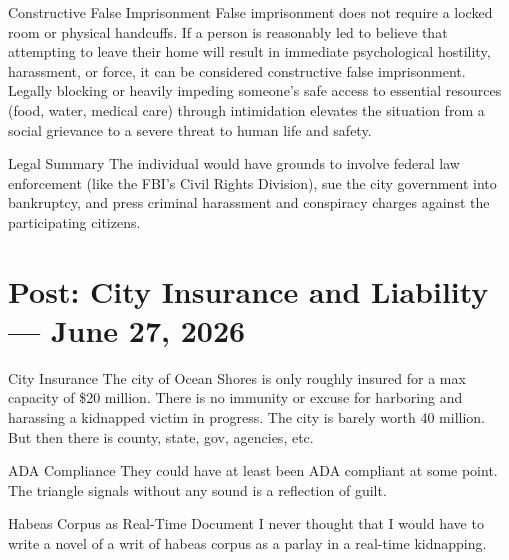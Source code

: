 \documentclass[12pt,openany]{book}
\begin{document}
\begin{evidencebox}{Constructive False Imprisonment}
False imprisonment does not require a locked room or physical handcuffs. If a person is reasonably led to believe that attempting to leave their home will result in immediate psychological hostility, harassment, or force, it can be considered constructive false imprisonment. Legally blocking or heavily impeding someone's safe access to essential resources (food, water, medical care) through intimidation elevates the situation from a social grievance to a severe threat to human life and safety.
\end{evidencebox}


\begin{evidencebox}{Legal Summary}
The individual would have grounds to involve federal law enforcement (like the FBI's Civil Rights Division), sue the city government into bankruptcy, and press criminal harassment and conspiracy charges against the participating citizens.
\end{evidencebox}

\section{Post: City Insurance and Liability --- June 27, 2026}

\begin{evidencebox}{City Insurance}
The city of Ocean Shores is only roughly insured for a max capacity of \$20 million. There is no immunity or excuse for harboring and harassing a kidnapped victim in progress. The city is barely worth 40 million. But then there is county, state, gov, agencies, etc.
\end{evidencebox}

\begin{evidencebox}{ADA Compliance}
They could have at least been ADA compliant at some point. The triangle signals without any sound is a reflection of guilt.
\end{evidencebox}

\begin{evidencebox}{Habeas Corpus as Real-Time Document}
I never thought that I would have to write a novel of a writ of habeas corpus as a parlay in a real-time kidnapping.
\end{evidencebox}
\end{document}
